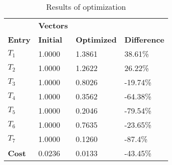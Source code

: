 \begin{table}[H]
\centering
\begin{tabular}{llll}
\textbf{}      & \cellcolor[HTML]{EFEFEF}\textbf{Vectors} & \textbf{} & \textbf{}         \\
\rowcolor[HTML]{EFEFEF} 
\textbf{Entry} & \textbf{Initial} & \textbf{Optimized} & \textbf{Difference} \\
$T_1$ & 1.0000 & 1.3861 & 38.61\% \\ 
$T_2$ & 1.0000 & 1.2622 & 26.22\% \\ 
$T_3$ & 1.0000 & 0.8026 & -19.74\% \\ 
$T_4$ & 1.0000 & 0.3562 & -64.38\% \\ 
$T_5$ & 1.0000 & 0.2046 & -79.54\% \\ 
$T_6$ & 1.0000 & 0.7635 & -23.65\% \\ 
$T_7$ & 1.0000 & 0.1260 & -87.4\% \\ 
\rowcolor[HTML]{EFEFEF} 
\textbf{Cost}  & 0.0236 & 0.0133 & -43.45\% \\ 
\end{tabular}
\caption{Results of optimization}
\label{tab:OptimizationAnalysis}
\end{table}